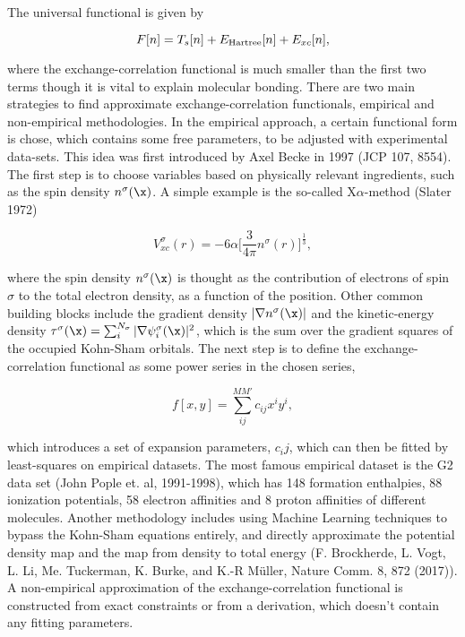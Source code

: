 \documentclass{homework}
\begin{document}
The universal functional is given by 

\begin{equation}
    F[n] = T_s[n] + E_{\textnormal{Hartree}}[n] + E_{xc}[n], 
\end{equation}

where the exchange-correlation functional is much smaller than the first two terms though it is vital to explain molecular bonding. There are two main strategies to find approximate exchange-correlation functionals, empirical and non-empirical methodologies. In the empirical approach, a certain functional form is chose, which contains some free parameters, to be adjusted with experimental data-sets. This idea was first introduced by Axel Becke in 1997 (JCP 107, 8554). The first step is to choose variables based on physically relevant ingredients, such as the spin density $n^{\sigma}(\x)$. A simple example is the so-called X$\alpha$-method (Slater 1972) 

$$
V_{xc}^{\sigma}(r) = -6\alpha \bigg[\frac{3}{4\pi} n^{\sigma}(r)\bigg]^{\frac{1}{3}},
$$

where the spin density $n^{\sigma}(\x)$ is thought as the contribution of electrons of spin $\sigma$ to the total electron density, as a function of the position. Other common building blocks include the gradient density $|\nabla n^{\sigma}(\x)|$ and the kinetic-energy density $\tau^{\sigma}(\x) = \sum_{i}^{N_\sigma} |\nabla \psi_i^\sigma(\x)|^2$, which is the sum over the gradient squares of the occupied Kohn-Sham orbitals. The next step is to define the exchange-correlation functional as some power series in the chosen series, 

$$
f[x,y] = \sum_{ij}^{MM'} c_{ij} x^i y^i,
$$

which introduces a set of expansion parameters, $c_ij$, which can then be fitted by least-squares on empirical datasets. The most famous empirical dataset is the G2 data set (John Pople et. al, 1991-1998), which has 148 formation enthalpies, 88 ionization potentials, 58 electron affinities and 8 proton affinities of different molecules. Another methodology includes using Machine Learning techniques to bypass the Kohn-Sham equations entirely, and directly approximate the potential density map and the map from density to total energy (F. Brockherde, L. Vogt, L. Li, Me. Tuckerman, K. Burke, and K.-R M\"uller, Nature Comm. 8, 872 (2017)). \\

A non-empirical approximation of the exchange-correlation functional is constructed from exact constraints or from a derivation, which doesn't contain any fitting parameters. \\
\end{document}
